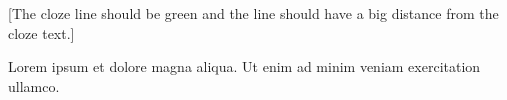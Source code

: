\documentclass{article}
\begin{document}
[The cloze line should be green and the line should have a big
distance from the cloze text.]

Lorem ipsum  et dolore magna aliqua. Ut enim ad
minim veniam exercitation ullamco.

\end{document}
